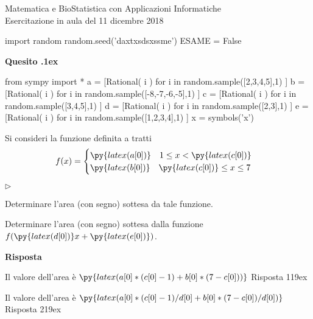 \documentclass[11pt,twoside,a4paper]{article}
\newcommand{\mylabel}[1]{#1\hfill}
\renewenvironment{itemize}
  {\begin{list}{$\triangleright$}{%
   \setlength{\parskip}{0mm}
   \setlength{\topsep}{.4\baselineskip}
   \setlength{\rightmargin}{0mm}
   \setlength{\listparindent}{0mm}
   \setlength{\itemindent}{0mm}
   \setlength{\labelwidth}{2ex}
   \setlength{\itemsep}{.4\baselineskip}
   \setlength{\parsep}{0mm}
   \setlength{\partopsep}{0mm}
   \setlength{\labelsep}{1ex}
   \setlength{\leftmargin}{\labelwidth+\labelsep}
   \let\makelabel\mylabel}}{%
   \end{list}\vspace*{-1.3mm}}
\newcounter{quesito}
\newenvironment{question}{\addtocounter{quesito}{1}\par\textbf{Quesito \thequesito.\kern1ex}}{\vspace{0.5\parskip}}
\newenvironment{answer}{\par\textbf{Risposta\quad}}{\vspace{\parskip}}
\begin{document}
\colorbox{blue!10}{\begin{minipage}{\textwidth}
Matematica e BioStatistica con Applicazioni Informatiche\\
Esercitazione in aula del 11 dicembre 2018
\end{minipage}}



\begin{pycode}
import random
random.seed('daxtxsdsxssme')
ESAME = False
\end{pycode}

\begin{question}
\begin{pycode}
from sympy import *
a = [Rational( i ) for i in random.sample([2,3,4,5],1) ]
b = [Rational( i ) for i in random.sample([-8,-7,-6,-5],1) ]
c = [Rational( i ) for i in random.sample([3,4,5],1) ]
d = [Rational( i ) for i in random.sample([2,3],1) ]
e = [Rational( i ) for i in random.sample([1,2,3,4],1) ]
x = symbols('x')
\end{pycode}
Si consideri la funzione definita a tratti 
\[f(x) = \begin{cases} \py{latex(a[0])} \quad 1 \leq x < \py{latex(c[0])} \cr \py{latex(b[0])} \quad \py{latex(c[0])} \leq x \leq 7 \end{cases}\]
\begin{itemize}
\item[1.] Determinare l'area (con segno) sottesa da tale funzione.
\item[2.] Determinare l'area (con segno) sottesa dalla funzione $f(\py{latex(d[0])}x + \py{latex(e[0])})$.
\end{itemize}
\begin{answer}

{\color{blue} Il valore dell'area è $\py{latex(a[0]*(c[0]-1)+b[0]*(7-c[0]))}$
\hfill Risposta 1\kern19ex}

\smallskip
{\color{blue} Il valore dell'area è $\py{latex(a[0]*(c[0]-1)/d[0]+b[0]*(7-c[0])/d[0])}$
\hfill Risposta 2\kern19ex}

\end{answer}
\end{question}
\end{document}
